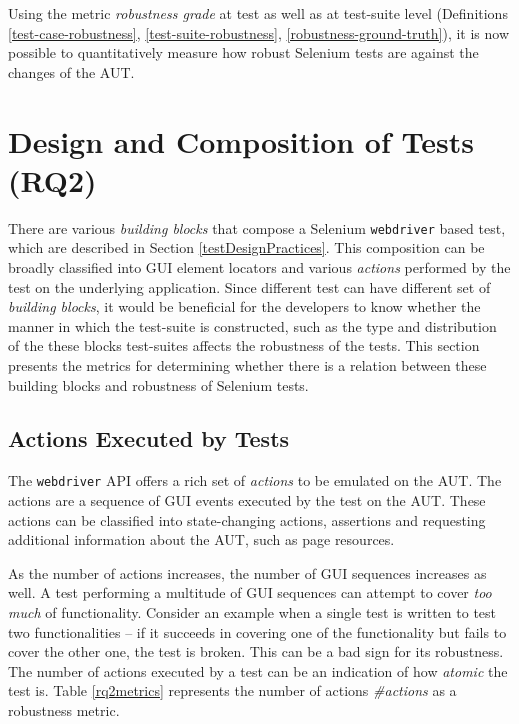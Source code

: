 Using the metric \textit{robustness grade} at test as well as at test-suite level (Definitions \ref{test-case-robustness}, \ref{test-suite-robustness}, \ref{robustness-ground-truth}), it is now possible to quantitatively measure how robust Selenium tests are against the changes of the AUT. 

\section{Design and Composition of Tests (RQ2)}
\label{robfactors}
There are various \textit{building blocks} that compose a Selenium \texttt{webdriver} based test, which are described in Section \ref{testDesignPractices}. This composition can be broadly classified into GUI element locators and various \textit{actions} performed by the test on the underlying application. Since different test can have different set of \textit{building blocks}, it would be beneficial for the developers to know whether the manner in which the test-suite is constructed, such as the type and distribution of the these blocks test-suites affects the robustness of the tests. This section presents the metrics for determining whether there is a relation between these building blocks and robustness of Selenium tests.  

\subsection{Actions Executed by Tests}
\label{test-actions}
The \texttt{webdriver} API offers a rich set of \textit{actions} to be emulated on the AUT. The actions are a sequence of GUI events executed by the test on the AUT. These actions can be classified into state-changing actions, assertions and requesting additional information about the AUT, such as page resources. 

As the number of actions increases, the number of GUI sequences increases as well. A test performing a multitude of GUI sequences can attempt to cover \textit{too much} of functionality. Consider an example when a single test is written to test two functionalities -- if it succeeds in covering one of the functionality but fails to cover the other one, the test is broken. This can be a bad sign for its robustness. 
The number of actions executed by a test can be an indication of how \textit{atomic} the test is. Table \ref{rq2metrics} represents the number of actions \textit{\#actions} as a robustness metric. 

